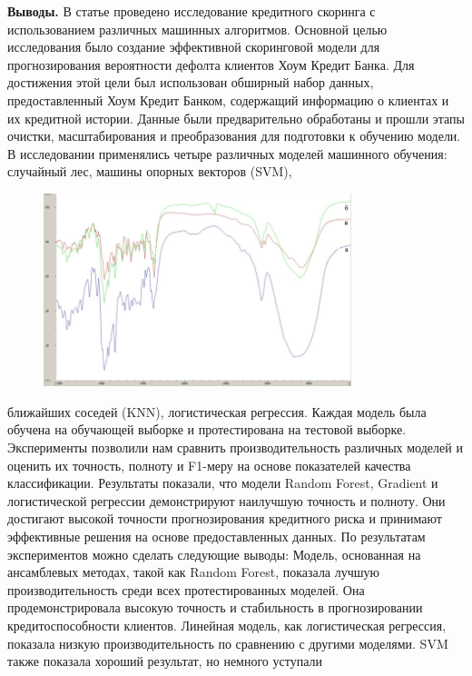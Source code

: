 {\bfseries Выводы.} В статье проведено исследование кредитного скоринга с
использованием различных машинных алгоритмов. Основной целью
исследования было создание эффективной скоринговой модели для
прогнозирования вероятности дефолта клиентов Хоум Кредит Банка. Для
достижения этой цели был использован обширный набор данных,
предоставленный Хоум Кредит Банком, содержащий информацию о клиентах и
\hspace{0pt}\hspace{0pt}их кредитной истории. Данные были предварительно
обработаны и прошли этапы очистки, масштабирования и преобразования для
подготовки к обучению модели. В исследовании применялись четыре
различных моделей машинного обучения: случайный лес, машины опорных
векторов (SVM), \begin{figure}[H]
	\centering
	\includegraphics[width=0.8\textwidth]{assets/44}
	\caption*{}
\end{figure}ближайших соседей
(KNN), логистическая регрессия. Каждая модель была обучена на обучающей
выборке и протестирована на тестовой выборке. Эксперименты позволили нам
сравнить производительность различных моделей и оценить их точность,
полноту и F1-меру на основе показателей качества классификации.
Результаты показали, что модели Random Forest, Gradient и логистической
регрессии демонстрируют наилучшую точность и полноту. Они достигают
высокой точности прогнозирования кредитного риска и принимают
эффективные решения на основе предоставленных данных. По результатам
экспериментов можно сделать следующие выводы: Модель, основанная на
ансамблевых методах, такой как Random Forest, показала лучшую
производительность среди всех протестированных моделей. Она
продемонстрировала высокую точность и стабильность в прогнозировании
кредитоспособности клиентов. Линейная модель, как логистическая
регрессия, показала низкую производительность по сравнению с другими
моделями. SVM также показала хороший результат, но немного уступали
